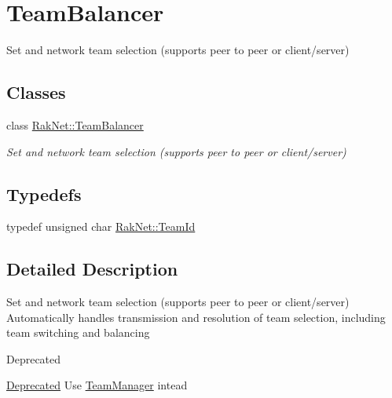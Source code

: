 \hypertarget{group___t_e_a_m___b_a_l_a_n_c_e_r___g_r_o_u_p}{\section{Team\-Balancer}
\label{group___t_e_a_m___b_a_l_a_n_c_e_r___g_r_o_u_p}
}


Set and network team selection (supports peer to peer or client/server)  


\subsection*{Classes}
\begin{DoxyCompactItemize}
\item 
class \hyperlink{class_rak_net_1_1_team_balancer}{Rak\-Net\-::\-Team\-Balancer}
\begin{DoxyCompactList}\small\item\em Set and network team selection (supports peer to peer or client/server) \end{DoxyCompactList}\end{DoxyCompactItemize}
\subsection*{Typedefs}
\begin{DoxyCompactItemize}
\item 
typedef unsigned char \hyperlink{group___t_e_a_m___b_a_l_a_n_c_e_r___g_r_o_u_p_ga79c7825649955f28135498fb3d9f6894}{Rak\-Net\-::\-Team\-Id}
\end{DoxyCompactItemize}


\subsection{Detailed Description}
Set and network team selection (supports peer to peer or client/server) Automatically handles transmission and resolution of team selection, including team switching and balancing \begin{DoxyRefDesc}{Deprecated}
\item[\hyperlink{deprecated__deprecated000010}{Deprecated}]Use \hyperlink{class_rak_net_1_1_team_manager}{Team\-Manager} intead \end{DoxyRefDesc}


